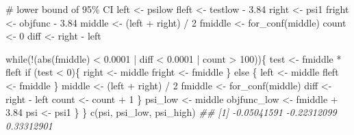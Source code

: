 \documentclass[
  10pt,
  a4paper,
]{book}
\newenvironment{Shaded}{\begin{snugshade}}{\end{snugshade}}
\newcommand{\CommentTok}[1]{\textcolor[rgb]{0.37,0.37,0.37}{#1}}
\newcommand{\ControlFlowTok}[1]{\textcolor[rgb]{0.00,0.46,0.62}{#1}}
\newcommand{\DecValTok}[1]{\textcolor[rgb]{0.68,0.00,0.00}{#1}}
\newcommand{\DocumentationTok}[1]{\textcolor[rgb]{0.37,0.37,0.37}{\textit{#1}}}
\newcommand{\FloatTok}[1]{\textcolor[rgb]{0.68,0.00,0.00}{#1}}
\newcommand{\FunctionTok}[1]{\textcolor[rgb]{0.28,0.35,0.67}{#1}}
\newcommand{\NormalTok}[1]{\textcolor[rgb]{0.00,0.46,0.62}{#1}}
\newcommand{\OtherTok}[1]{\textcolor[rgb]{0.00,0.46,0.62}{#1}}
\newcommand{\SpecialCharTok}[1]{\textcolor[rgb]{0.37,0.37,0.37}{#1}}
\begin{document}
\begin{Shaded}
\begin{Highlighting}[]
    \CommentTok{\# lower bound of 95\% CI}
\NormalTok{    left }\OtherTok{\textless{}{-}}\NormalTok{ psilow}
\NormalTok{    fleft }\OtherTok{\textless{}{-}}\NormalTok{ testlow }\SpecialCharTok{{-}} \FloatTok{3.84}
\NormalTok{    right }\OtherTok{\textless{}{-}}\NormalTok{ psi1}
\NormalTok{    fright }\OtherTok{\textless{}{-}}\NormalTok{ objfunc }\SpecialCharTok{{-}} \FloatTok{3.84}
\NormalTok{    middle }\OtherTok{\textless{}{-}}\NormalTok{ (left }\SpecialCharTok{+}\NormalTok{ right) }\SpecialCharTok{/} \DecValTok{2}
\NormalTok{    fmiddle }\OtherTok{\textless{}{-}} \FunctionTok{for\_conf}\NormalTok{(middle)}
\NormalTok{    count }\OtherTok{\textless{}{-}} \DecValTok{0}
\NormalTok{    diff }\OtherTok{\textless{}{-}}\NormalTok{ right }\SpecialCharTok{{-}}\NormalTok{ left}
    
    \ControlFlowTok{while}\NormalTok{(}\SpecialCharTok{!}\NormalTok{(}\FunctionTok{abs}\NormalTok{(fmiddle) }\SpecialCharTok{\textless{}} \FloatTok{0.0001} \SpecialCharTok{|}\NormalTok{ diff }\SpecialCharTok{\textless{}} \FloatTok{0.0001} \SpecialCharTok{|}\NormalTok{ count }\SpecialCharTok{\textgreater{}} \DecValTok{100}\NormalTok{))\{}
\NormalTok{      test }\OtherTok{\textless{}{-}}\NormalTok{ fmiddle }\SpecialCharTok{*}\NormalTok{ fleft}
      \ControlFlowTok{if}\NormalTok{ (test }\SpecialCharTok{\textless{}} \DecValTok{0}\NormalTok{)\{}
\NormalTok{        right }\OtherTok{\textless{}{-}}\NormalTok{ middle}
\NormalTok{        fright }\OtherTok{\textless{}{-}}\NormalTok{ fmiddle}
\NormalTok{      \} }\ControlFlowTok{else}\NormalTok{ \{}
\NormalTok{        left }\OtherTok{\textless{}{-}}\NormalTok{ middle}
\NormalTok{        fleft }\OtherTok{\textless{}{-}}\NormalTok{ fmiddle}
\NormalTok{      \}}
\NormalTok{      middle }\OtherTok{\textless{}{-}}\NormalTok{ (left }\SpecialCharTok{+}\NormalTok{ right) }\SpecialCharTok{/} \DecValTok{2}
\NormalTok{      fmiddle }\OtherTok{\textless{}{-}} \FunctionTok{for\_conf}\NormalTok{(middle)}
\NormalTok{      diff }\OtherTok{\textless{}{-}}\NormalTok{ right }\SpecialCharTok{{-}}\NormalTok{ left}
\NormalTok{      count }\OtherTok{\textless{}{-}}\NormalTok{ count }\SpecialCharTok{+} \DecValTok{1}
\NormalTok{    \}}
\NormalTok{    psi\_low }\OtherTok{\textless{}{-}}\NormalTok{ middle}
\NormalTok{    objfunc\_low }\OtherTok{\textless{}{-}}\NormalTok{ fmiddle }\SpecialCharTok{+} \FloatTok{3.84}
\NormalTok{    psi }\OtherTok{\textless{}{-}}\NormalTok{ psi1}
\NormalTok{  \}}
\NormalTok{\}}
\FunctionTok{c}\NormalTok{(psi, psi\_low, psi\_high)}
\DocumentationTok{\#\# [1] {-}0.05041591 {-}0.22312099  0.33312901}
\end{Highlighting}
\end{Shaded}
\end{document}
